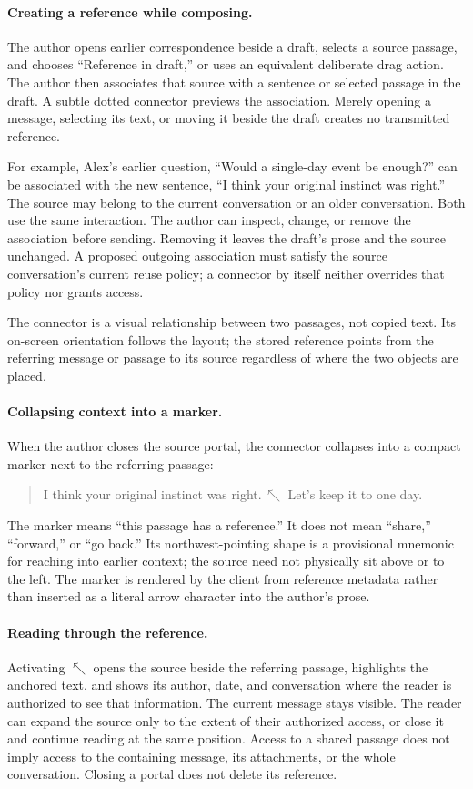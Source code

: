 \documentclass[11pt]{article}
\DeclareRobustCommand{\refmark}{\ensuremath{\nwarrow}}
\begin{document}
\paragraph{Creating a reference while composing.}
The author opens earlier correspondence beside a draft, selects a source passage, and chooses ``Reference in draft,'' or uses an equivalent deliberate drag action. The author then associates that source with a sentence or selected passage in the draft. A subtle dotted connector previews the association. Merely opening a message, selecting its text, or moving it beside the draft creates no transmitted reference.

For example, Alex's earlier question, ``Would a single-day event be enough?'' can be associated with the new sentence, ``I think your original instinct was right.'' The source may belong to the current conversation or an older conversation. Both use the same interaction. The author can inspect, change, or remove the association before sending. Removing it leaves the draft's prose and the source unchanged. A proposed outgoing association must satisfy the source conversation's current reuse policy; a connector by itself neither overrides that policy nor grants access.

The connector is a visual relationship between two passages, not copied text. Its on-screen orientation follows the layout; the stored reference points from the referring message or passage to its source regardless of where the two objects are placed.

\paragraph{Collapsing context into a marker.}
When the author closes the source portal, the connector collapses into a compact marker next to the referring passage:

\begin{quote}
I think your original instinct was right.\,\refmark{} Let's keep it to one day.
\end{quote}

The marker means ``this passage has a reference.'' It does not mean ``share,'' ``forward,'' or ``go back.'' Its northwest-pointing shape is a provisional mnemonic for reaching into earlier context; the source need not physically sit above or to the left. The marker is rendered by the client from reference metadata rather than inserted as a literal arrow character into the author's prose.

\paragraph{Reading through the reference.}
Activating \refmark{} opens the source beside the referring passage, highlights the anchored text, and shows its author, date, and conversation where the reader is authorized to see that information. The current message stays visible. The reader can expand the source only to the extent of their authorized access, or close it and continue reading at the same position. Access to a shared passage does not imply access to the containing message, its attachments, or the whole conversation. Closing a portal does not delete its reference.
\end{document}

